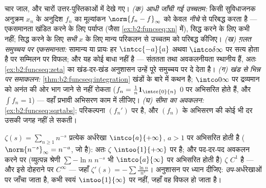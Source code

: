 \begin{remark}[सामान्य भूलें]
चार जाल, और चारों उत्तर-पुस्तिकाओं में देखे गए। \emph{(क) आधी जाँची गई
उच्चतम:} किसी सुविधाजनक अनुक्रम $x_n$ के अनुदिश $f_n$ का मूल्यांकन $\norm{f_n - f}_\infty$ को
केवल \emph{नीचे} से परिबद्ध करता है --- एकसमानता खंडित करने के लिए
पर्याप्त (जैसा \cref{ex:b2:funcseq:xn} में), सिद्ध करने के लिए कभी नहीं; सिद्ध करने के लिए
\emph{सभी} $x$ के लिए मान्य परिकलन से उच्चतम को परिबद्ध कीजिए। \emph{(ख)
ग़लत समुच्चय पर एकसमानता:} सामान्य या  प्रायः हर $\intcc{-a}{a}$ अथवा
$\intco\delta\infty$ पर सत्य होता है पर  सम्मिलन पर विफल; और यह कोई बाधा नहीं है ---
संततता तथा अवकलनीयता स्थानीय हैं, अतः \cref{ex:b2:funcseq:zeta} का खंड-दर-खंड अनुशासन उन्हें
पूरे  समुच्चय पर दे देता है। \emph{(ग) खंड से भिन्न पर समाकलन:} \cref{thm:b2:funcseq:integration}
खंडों के बारे में कथन है; $\intco0\infty$ पर  द्रव्यमान को अनंत की ओर
भाग जाने से नहीं रोकता ($f_n =
\frac1n\mathbf 1_{\intcc{0}{n}}$ $0$ पर  अभिसरित होते हैं, और
$\int f_n = 1$) --- वहाँ प्रभावी अभिसरण काम में लीजिए। \emph{(घ) सीमा का अवकलन:}
\cref{ex:b2:funcseq:sqrtabs}; परिकल्पना $(f_n')$ पर है, और $(f_n)$ के अभिसरण की कोई भी दर उसकी जगह नहीं
ले सकती।
\end{remark}

\begin{example}\label{ex:b2:funcseq:zeta}
$\zeta(s) = \sum_{n\geq1} n^{-s}$ प्रत्येक अर्धरेखा $\intco{a}{+\infty}$, $a > 1$ पर  अभिसरित होती है ($\norm{n^{-s}}_\infty =
n^{-a}$, जो
 है): अतः $\zeta$ $\intoo{1}{+\infty}$ पर  है; और पद-दर-पद अवकलन करने पर (व्युत्पन्न
श्रेणी $\sum -\ln n\; n^{-s}$ भी $\intco{a}{\infty}$ पर  अभिसरित होती है) $\zeta$ $C^1$ है --- और
इसे दोहराने पर $C^\infty$ --- जहाँ $\zeta'(s) = -\sum \frac{\ln
n}{n^s}$। अनुशासन पर ध्यान दीजिए:  \emph{उप}-अर्धरेखाओं पर जाँचा जाता है, कभी स्वयं  $\intoo{1}{\infty}$ पर
नहीं, जहाँ वह विफल हो जाता है।
\end{example}

